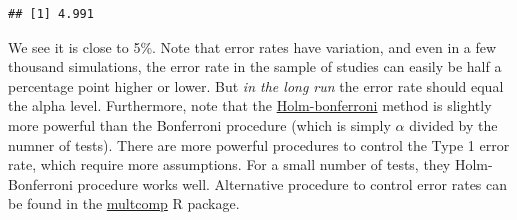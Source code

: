 \documentclass[]{article}
\begin{document}
\begin{verbatim}
## [1] 4.991
\end{verbatim}

We see it is close to 5\%. Note that error rates have variation, and
even in a few thousand simulations, the error rate in the sample of
studies can easily be half a percentage point higher or lower. But
\emph{in the long run} the error rate should equal the alpha level.
Furthermore, note that the
\href{https://en.wikipedia.org/wiki/Holm\%E2\%80\%93Bonferroni_method}{Holm-bonferroni}
method is slightly more powerful than the Bonferroni procedure (which is
simply \(\alpha\) divided by the numner of tests). There are more
powerful procedures to control the Type 1 error rate, which require more
assumptions. For a small number of tests, they Holm-Bonferroni procedure
works well. Alternative procedure to control error rates can be found in
the
\href{https://cran.r-project.org/web/packages/multcomp/index.html}{multcomp}
R package.
\end{document}
